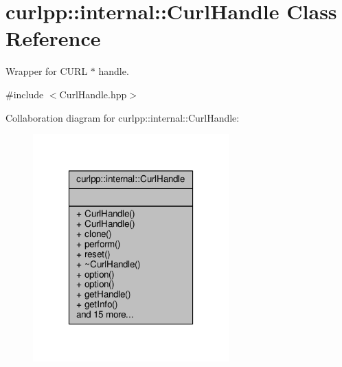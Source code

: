 \hypertarget{classcurlpp_1_1internal_1_1CurlHandle}{\section{curlpp\-:\-:internal\-:\-:Curl\-Handle Class Reference}
\label{classcurlpp_1_1internal_1_1CurlHandle}
}


Wrapper for C\-U\-R\-L $\ast$ handle.  




{\ttfamily \#include $<$Curl\-Handle.\-hpp$>$}



Collaboration diagram for curlpp\-:\-:internal\-:\-:Curl\-Handle\-:
\nopagebreak
\begin{figure}[H]
\begin{center}
\leavevmode
\includegraphics[width=214pt]{classcurlpp_1_1internal_1_1CurlHandle__coll__graph}
\end{center}
\end{figure}
